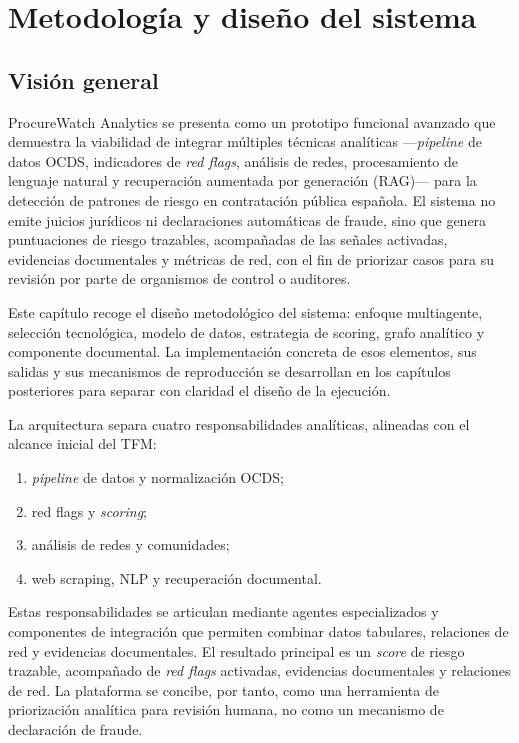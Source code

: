 \documentclass[11pt,a4paper,spanish]{book}
\numberwithin{equation}{chapter}
\numberwithin{figure}{chapter}
\begin{document}
\chapter{Metodolog{\'i}a y dise{\~n}o del sistema}
\label{cap:arquitectura_tecnica}

\section{Visi{\'o}n general}
\label{sec:vision_general_arquitectura}


ProcureWatch Analytics se presenta como un prototipo funcional avanzado que demuestra la viabilidad de integrar múltiples técnicas analíticas —\textit{pipeline} de datos OCDS, indicadores de \textit{red flags}, análisis de redes, procesamiento de lenguaje natural y recuperación aumentada por generación (RAG)— para la detección de patrones de riesgo en contratación pública española. El sistema no emite juicios jurídicos ni declaraciones automáticas de fraude, sino que genera puntuaciones de riesgo trazables, acompañadas de las señales activadas, evidencias documentales y métricas de red, con el fin de priorizar casos para su revisión por parte de organismos de control o auditores.

Este cap{\'i}tulo recoge el dise{\~n}o metodol{\'o}gico del sistema: enfoque multiagente, selecci{\'o}n tecnol{\'o}gica, modelo de datos, estrategia de scoring, grafo anal{\'i}tico y componente documental. La implementaci{\'o}n concreta de esos elementos, sus salidas y sus mecanismos de reproducci{\'o}n se desarrollan en los cap{\'i}tulos posteriores para separar con claridad el dise{\~n}o de la ejecuci{\'o}n.

La arquitectura separa cuatro responsabilidades analíticas, alineadas con el alcance inicial del TFM:
\begin{enumerate}
\item \textit{pipeline} de datos y normalización OCDS;
\item red flags y \textit{scoring};
\item análisis de redes y comunidades;
\item web scraping, NLP y recuperación documental.
\end{enumerate}
Estas responsabilidades se articulan mediante agentes especializados y componentes de integración que permiten combinar datos tabulares, relaciones de red y evidencias documentales. El resultado principal es un \textit{score} de riesgo trazable, acompañado de \textit{red flags} activadas, evidencias documentales y relaciones de red. La plataforma se concibe, por tanto, como una herramienta de priorización analítica para revisión humana, no como un mecanismo de declaración de fraude.
\end{document}
